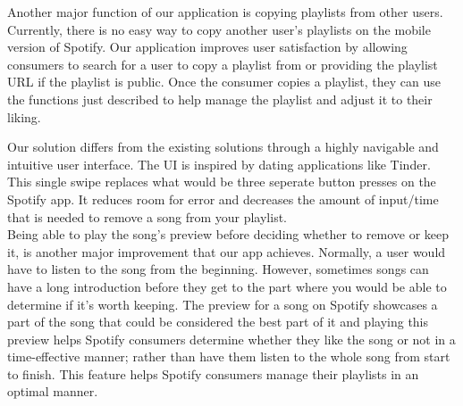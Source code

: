 \documentclass{article}
\begin{document}
\quad Another major function of our application is copying playlists from other users. Currently, there is no easy way to copy another user’s playlists on the mobile version of Spotify. Our application improves user satisfaction by allowing consumers to search for a user to copy a playlist from or providing the playlist URL if the playlist is public. Once the consumer copies a playlist, they can use the functions just described to help manage the playlist and adjust it to their liking.

\quad Our solution differs from the existing solutions through a highly navigable and intuitive user interface. The UI is inspired by dating applications like Tinder. This single swipe replaces what would be three seperate button presses on the Spotify app.  It reduces room for error and decreases the amount of input/time that is needed to remove a song from your playlist.
\\

\quad Being able to play the song’s preview before deciding whether to remove or keep it, is another major improvement that our app achieves. Normally, a user would have to listen to the song from the beginning. However, sometimes songs can have a long introduction before they get to the part where you would be able to determine if it’s worth keeping. The preview for a song on Spotify showcases a part of the song that could be considered the best part of it and playing this preview helps Spotify consumers determine whether they like the song or not in a time-effective manner; rather than have them listen to the whole song from start to finish. This feature helps Spotify consumers manage their playlists in an optimal manner.
\\

\end{document}
